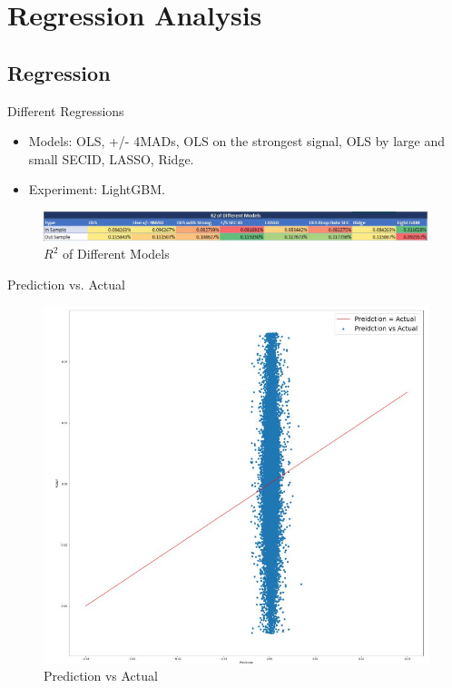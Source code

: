 \documentclass{beamer}
\begin{document}
\section{Regression Analysis}
\subsection{Regression}
\begin{frame}{Different Regressions}
\begin{itemize}
    \item Models: OLS, +/- 4MADs, OLS on the strongest signal, OLS by large and small SECID, LASSO, Ridge.
    \item Experiment: LightGBM.
\end{itemize}

\begin{figure}[ht]
\centering
\includegraphics[scale=0.4]{Regression_Performance_V2.JPG}
\caption{$R^{2}$ of Different Models}
\label{fig:label}
\end{figure}

\end{frame}



\begin{frame}{Prediction vs. Actual}
\begin{figure}[ht]
    \centering
    \includegraphics[scale=0.3]{Reg_Pred_vs_Act.JPG}
    \caption{Prediction vs Actual}
    \label{fig:label}
\end{figure}

\end{frame}
\end{document}
